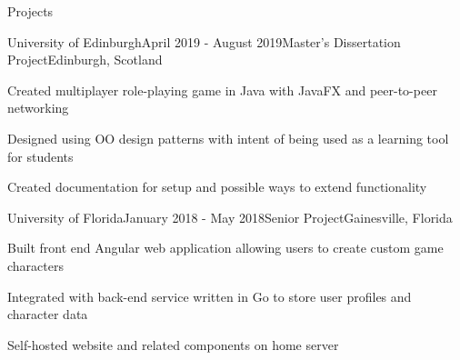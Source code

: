 \documentclass[
	11pt, %
]{resume} %
\begin{document}
\begin{rSection}{Projects}

	\begin{rSubsection}{University of Edinburgh}{April 2019 - August 2019}{Master's Dissertation Project}{Edinburgh, Scotland}
		\item Created multiplayer role-playing game in Java with JavaFX and peer-to-peer networking
		\item Designed using OO design patterns with intent of being used as a learning tool for students
		\item Created documentation for setup and possible ways to extend functionality
	\end{rSubsection}


	\begin{rSubsection}{University of Florida}{January 2018 - May 2018}{Senior Project}{Gainesville, Florida}
		\item Built front end Angular web application allowing users to create custom game characters
		\item Integrated with back-end service written in Go to store user profiles and character data
		\item Self-hosted website and related components on home server
	\end{rSubsection}

\end{rSection}
\end{document}
